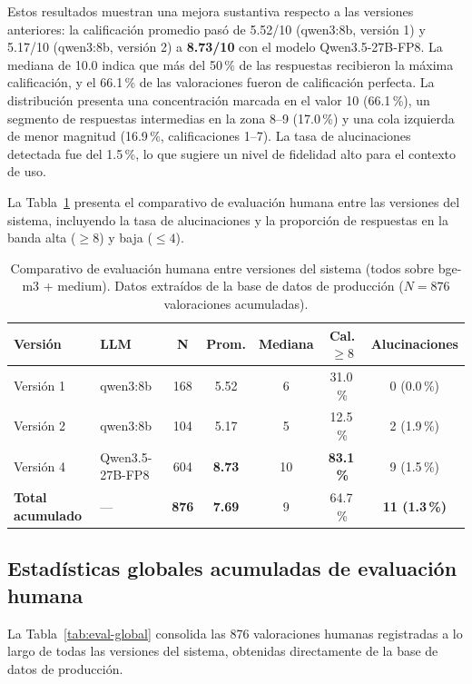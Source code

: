 Estos resultados muestran una mejora sustantiva respecto a las versiones anteriores: la calificación promedio pasó de 5.52/10 (qwen3:8b, versión 1) y 5.17/10 (qwen3:8b, versión 2) a \textbf{8.73/10} con el modelo Qwen3.5-27B-FP8. La mediana de 10.0 indica que más del 50\,\% de las respuestas recibieron la máxima calificación, y el 66.1\,\% de las valoraciones fueron de calificación perfecta. La distribución presenta una concentración marcada en el valor 10 (66.1\,\%), un segmento de respuestas intermedias en la zona 8--9 (17.0\,\%) y una cola izquierda de menor magnitud (16.9\,\%, calificaciones 1--7). La tasa de alucinaciones detectada fue del 1.5\,\%, lo que sugiere un nivel de fidelidad alto para el contexto de uso.

La Tabla~\ref{tab:comparativo-versiones} presenta el comparativo de evaluación humana entre las versiones del sistema, incluyendo la tasa de alucinaciones y la proporción de respuestas en la banda alta ($\geq 8$) y baja ($\leq 4$).

\begin{table}[H]
\centering
\small
\begin{tabular}{|l|l|c|c|c|c|c|}
\hline
\textbf{Versión} & \textbf{LLM} & \textbf{N} & \textbf{Prom.} & \textbf{Mediana} & \textbf{Cal. $\geq 8$} & \textbf{Alucinaciones} \\
\hline
Versión 1 & qwen3:8b               & 168 & 5.52 & 6 & 31.0\,\% & 0 (0.0\,\%) \\
Versión 2 & qwen3:8b               & 104 & 5.17 & 5 & 12.5\,\% & 2 (1.9\,\%) \\
Versión 4 & Qwen3.5-27B-FP8       & 604 & \textbf{8.73} & 10 & \textbf{83.1\,\%} & 9 (1.5\,\%) \\
\hline
\textbf{Total acumulado} & --- & \textbf{876} & \textbf{7.69} & 9 & 64.7\,\% & \textbf{11 (1.3\,\%)} \\
\hline
\end{tabular}
\caption{Comparativo de evaluación humana entre versiones del sistema (todos sobre bge-m3 + medium). Datos extraídos de la base de datos de producción ($N = 876$ valoraciones acumuladas).}
\label{tab:comparativo-versiones}
\end{table}

\subsection{Estadísticas globales acumuladas de evaluación humana}\label{sec:eval_global}

La Tabla~\ref{tab:eval-global} consolida las 876 valoraciones humanas registradas a lo largo de todas las versiones del sistema, obtenidas directamente de la base de datos de producción.

